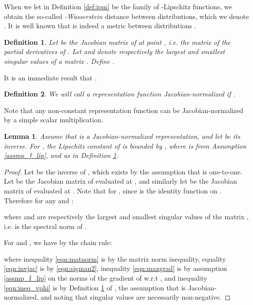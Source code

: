 \documentclass{article}
\newtheorem{thmappdef}{Definition}
\newtheorem{thmapplem}{Lemma}
\begin{document}
When we let  in Definition \ref{def:ipm} be the family of -Lipschitz functions, we obtain the so-called \emph{-Wasserstein} distance between distributions, which we denote .
It is well known that  is indeed a metric between distributions \cite{villani2008optimal}.




\begin{thmappdef}\label{def:rcondA}
Let  be the Jacobian matrix of  at point , i.e. the matrix of the partial derivatives of . Let  and  denote respectively the largest and smallest singular values of a matrix .
Define .
\end{thmappdef}
It is an immediate result that .

\begin{thmappdef}
We will call a representation function  \emph{Jacobian-normalized} if .
\end{thmappdef}
Note that any non-constant representation function  can be Jacobian-normalized by a simple scalar multiplication.


\begin{thmapplem}\label{lem:lip}
Assume that  is a Jacobian-normalized representation, and let  be its inverse.
For , the Lipschitz constant of  is bounded by , where   is from Assumption \ref{assmp_f_lip}, and  as in Definition \ref{def:rcondA}.
\end{thmapplem}
\begin{proof}
Let  be the inverse of , which exists by the assumption that  is one-to-one. Let  be the Jacobian matrix of  evaluated at , and similarly let  be the Jacobian matrix of  evaluated at . Note that  for , since  is the identity function on .	Therefore for any  and :

where  and  are respectively the largest and smallest singular values of the matrix , i.e.  is the spectral norm of .


For  and , we have by the chain rule:

where inequality \eqref{eqn:matnorm} is by the matrix norm inequality, equality \eqref{eqn:invjac} is by \eqref{eqn:sigman2}, inequality \eqref{eqn:maxgrad} is by assumption \ref{assmp_f_lip} on the norms of the gradient of  w.r.t  , and inequality \eqref{eqn:ineq_vphi} is by Definition \ref{def:rcondA} of , the assumption that  is Jacobian-normalized, and noting that singular values are necessarily non-negative.



\end{proof}
\end{document}

